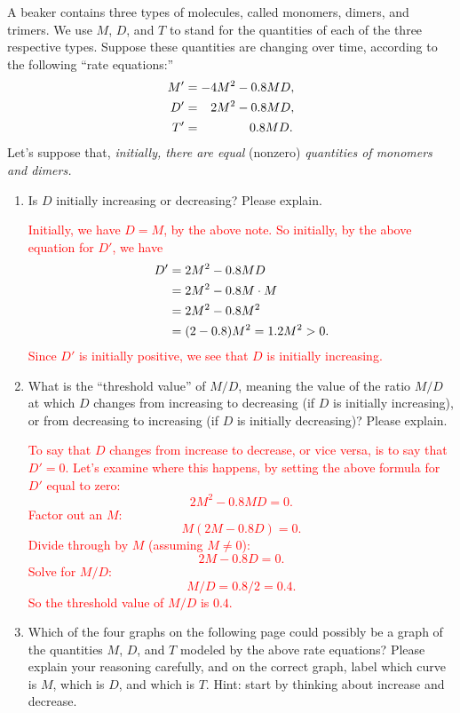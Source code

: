 \documentclass[12pt]{article}
\newcommand{\sol}[1]{\textcolor{red}{#1}}
\newcommand{\sol}[1]{\textcolor{white}{#1}}
\begin{document}
\chead{ }   

\noindent A beaker contains three types of molecules, called monomers, dimers, and trimers.  We use $M$, $D$, and $T$ to stand for the quantities of each of the three respective types. Suppose these quantities are changing over time, according to the following ``rate equations:''
$$\aligned M'&=-4M^2-0.8 M D,\\
D'&=\phantom{-}2M^2-0.8 M D,\\T'&= \phantom{-2M^2-\ }0.8 M D.\endaligned$$
\noindent   Let's suppose that, {\it  initially, there are equal} (nonzero) {\it quantities of monomers and dimers.}
\begin{enumerate}\item Is $D$ initially increasing or decreasing?  Please explain.

\sol{Initially, we have $D=M$, by the above note.  So initially, by the above equation for $D'$, we have$$\aligned D'&=2M^2-0.8 M D\\&=2M^2-0.8M\cdot M\\&=2M^2-0.8M^2\\&=(2-0.8)M^2=1.2M^2>0.\endaligned$$  Since $D'$ is initially positive, we see that $D$ is initially increasing.}

\vfill
\item What is the ``threshold value'' of $M/D$, meaning the value of the ratio $M/D$ at which $D$ changes from increasing to decreasing  (if $D$ is initially increasing), or from decreasing to increasing (if $D$ is initially decreasing)?  Please explain.

\sol{To say that $D$ changes from increase to decrease, or vice versa, is to say that $D'=0$.  Let's examine where this happens, by setting the above formula for $D'$ equal to zero:
$$ 2M^2-0.8 M D=0.$$Factor out an $M$:
$$ M(2M-0.8  D)=0.$$ 
Divide through by $M$ (assuming $M\ne0$):
$$ 2M-0.8  D=0.$$Solve for $M/D$:
$$M/D=0.8/2=0.4.$$So the threshold value of $M/D$ is $0.4$.}

\item
 Which of the four graphs on the  following page could possibly be a graph of the quantities $M$, $D$, and $T$ modeled by the above rate equations?  Please explain your reasoning carefully, and on the correct graph, label which curve is $M$, which is $D$, and which is $T$. Hint:  start by thinking about increase and decrease.

\vfill\eject
\null\smallskip
\begin{center} 
 

\end{center}
\end{enumerate}
\end{document}
